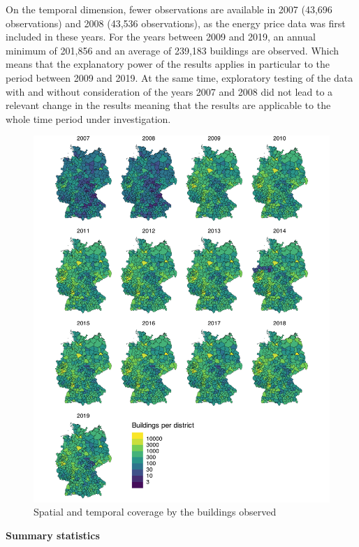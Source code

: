 \documentclass[12pt,twoside]{reedthesis}
\begin{document}
On the temporal dimension, fewer observations are available in 2007 (43,696 observations) and 2008 (43,536 observations), as the energy price data was first included in these years. For the years between 2009 and 2019, an annual minimum of 201,856 and an average of 239,183 buildings are observed. Which means that the explanatory power of the results applies in particular to the period between 2009 and 2019. At the same time, exploratory testing of the data with and without consideration of the years 2007 and 2008 did not lead to a relevant change in the results meaning that the results are applicable to the whole time period under investigation.
\begin{figure}

{\centering \includegraphics[width=0.77\linewidth]{figure/buildings_distribution} 

}

\caption{Spatial and temporal coverage by the buildings observed}\label{fig:buildings-distribution}
\end{figure}
\textbf{Summary statistics}
\end{document}
